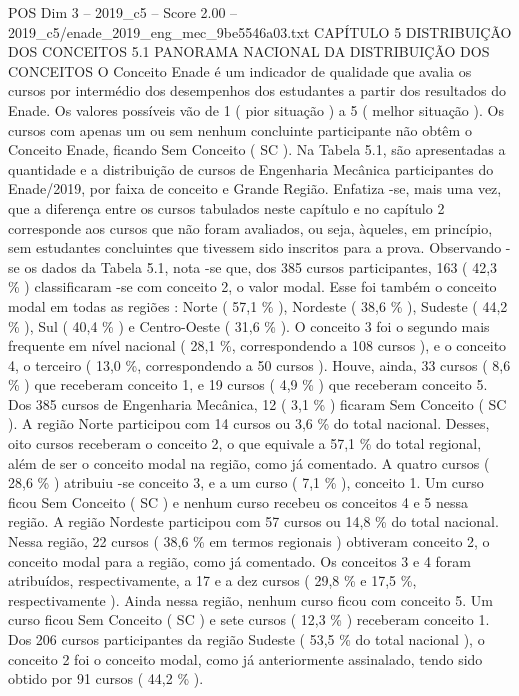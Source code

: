 \begin{textsample}{POS Dim 3 – 2019\_c5 – Score 2.00 – 2019\_c5/enade\_2019\_eng\_mec\_9be5546a03.txt}  \label{ex:f3_pos_075}
CAPÍTULO 5 DISTRIBUIÇÃO DOS CONCEITOS 5.1 PANORAMA NACIONAL DA DISTRIBUIÇÃO DOS CONCEITOS O Conceito Enade é um indicador de qualidade que avalia os cursos por intermédio dos desempenhos dos estudantes a partir dos resultados do Enade.
Os valores possíveis vão de 1 ( pior situação ) a 5 ( melhor situação ).
Os cursos com apenas um ou sem nenhum concluinte participante não obtêm o Conceito Enade, ficando Sem Conceito ( SC ).
Na Tabela 5.1, são apresentadas a quantidade e a distribuição de cursos de Engenharia Mecânica participantes do Enade/2019, por faixa de conceito e Grande Região.
Enfatiza -se, mais uma vez, que a diferença entre os cursos tabulados neste capítulo e no capítulo 2 corresponde aos cursos que não foram avaliados, ou seja, àqueles, em princípio, sem estudantes concluintes que tivessem sido inscritos para a prova.
Observando -se os dados da Tabela 5.1, nota -se que, dos 385 cursos participantes, 163 ( 42,3 \% ) classificaram -se com conceito 2, o valor modal.
Esse foi também o conceito modal em todas as regiões : Norte ( 57,1 \% ), Nordeste ( 38,6 \% ), Sudeste ( 44,2 \% ), Sul ( 40,4 \% ) e Centro-Oeste ( 31,6 \% ).
O conceito 3 foi o segundo mais frequente em nível nacional ( 28,1 \%, correspondendo a 108 cursos ), e o conceito 4, o terceiro ( 13,0 \%, correspondendo a 50 cursos ).
Houve, ainda, 33 cursos ( 8,6 \% ) que receberam conceito 1, e 19 cursos ( 4,9 \% ) que receberam conceito 5.
Dos 385 cursos de Engenharia Mecânica, 12 ( 3,1 \% ) ficaram Sem Conceito ( SC ).
A região Norte participou com 14 cursos ou 3,6 \% do total nacional.
Desses, oito cursos receberam o conceito 2, o que equivale a 57,1 \% do total regional, além de ser o conceito modal na região, como já comentado.
A quatro cursos ( 28,6 \% ) atribuiu -se conceito 3, e a um curso ( 7,1 \% ), conceito 1.
Um curso ficou Sem Conceito ( SC ) e nenhum curso recebeu os conceitos 4 e 5 nessa região.
A região Nordeste participou com 57 cursos ou 14,8 \% do total nacional.
Nessa região, 22 cursos ( 38,6 \% em termos regionais ) obtiveram conceito 2, o conceito modal para a região, como já comentado.
Os conceitos 3 e 4 foram atribuídos, respectivamente, a 17 e a dez cursos ( 29,8 \% e 17,5 \%, respectivamente ).
Ainda nessa região, nenhum curso ficou com conceito 5.
Um curso ficou Sem Conceito ( SC ) e sete cursos ( 12,3 \% ) receberam conceito 1.
Dos 206 cursos participantes da região Sudeste ( 53,5 \% do total nacional ), o conceito 2 foi o conceito modal, como já anteriormente assinalado, tendo sido obtido por 91 cursos ( 44,2 \% ).

\end{textsample}
